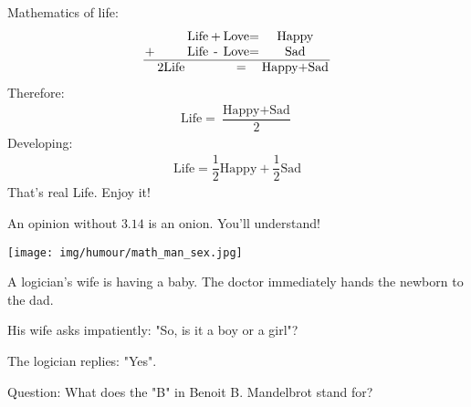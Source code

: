 	\begin{center}\underline{\hspace{5 cm}}\end{center}
	Mathematics of life:
	\begin{gather*}
		\setlength{\tabcolsep}{1pt}
		\begin{tabular}{cccccc}
		& & \text{Life} & + & \text{Love}= & \text{Happy} \\
		$+$& & \text{Life} & - & \text{Love}= & \text{Sad} \\ \hline
		&2\text{Life}& & & = & \text{Happy}+\text{Sad} \\
		\end{tabular}
	\end{gather*}
	Therefore:
	\begin{gather*}
		\text{Life}=\dfrac{\text{Happy}+\text{Sad}}{2}
	\end{gather*}
	Developing:
	\begin{gather*}
		\text{Life}=\dfrac{1}{2}\text{Happy}+\dfrac{1}{2}\text{Sad}
	\end{gather*}
	That's real Life. Enjoy it!
	
	\begin{center}\underline{\hspace{5 cm}}\end{center}
	An opinion without $3.14$ is an onion. You'll understand!
	
	\begin{center}\underline{\hspace{5 cm}}\end{center}

	\begin{center}
		\texttt{[image: img/humour/math\_man\_sex.jpg]}	
	\end{center}
	
	\begin{center}\underline{\hspace{5 cm}}\end{center}
	
	A logician's wife is having a baby. The doctor immediately hands the newborn to the dad.
	
	His wife asks impatiently: "So, is it a boy or a girl"?
	
	The logician replies: "Yes".

	\begin{center}\underline{\hspace{5 cm}}\end{center}
	Question: What does the "B" in Benoit B. Mandelbrot stand for?	
	
